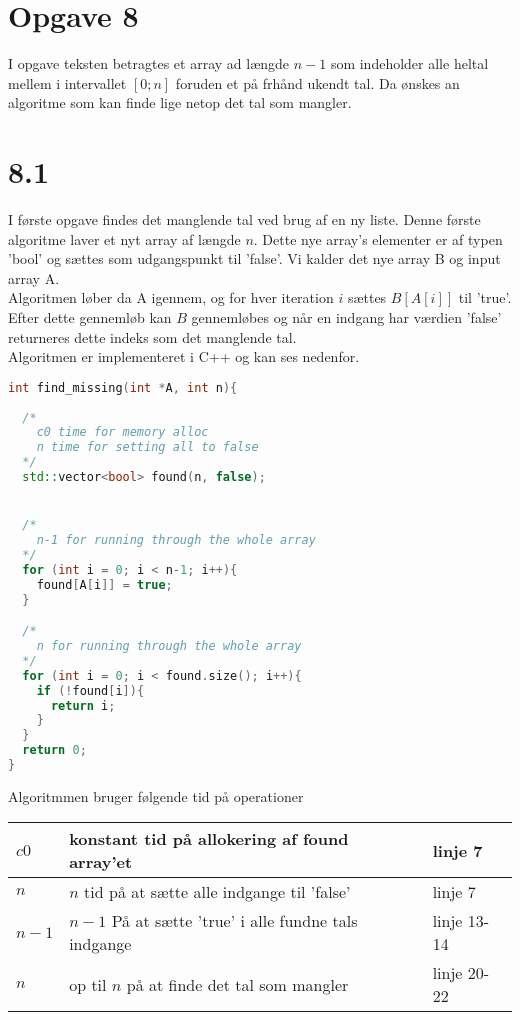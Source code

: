 \section*{Opgave 8}

I opgave teksten betragtes et array ad længde $n-1$ 
som indeholder alle heltal mellem i intervallet $\left[0;n\right]$ 
foruden et på frhånd ukendt tal. Da ønskes an algoritme som 
kan finde lige netop det tal som mangler.


\section*{8.1}

I første opgave findes det manglende tal ved brug af en ny liste.
Denne første algoritme laver et nyt array af længde $n$. Dette nye
array's elementer er af typen 'bool' og sættes som udgangspunkt til 'false'.
Vi kalder det nye array B og input array A.\\

Algoritmen løber da A igennem, og for hver iteration $i$ sættes 
$B \left[ A \left[ i \right] \right]$ til 'true'.\\

Efter dette gennemløb kan $B$ gennemløbes og når en indgang 
har værdien 'false' returneres dette indeks som det manglende tal.\\

Algoritmen er implementeret i C++ og kan ses nedenfor.


\begin{lstlisting}[language=C++]
int find_missing(int *A, int n){
  
  /*
    c0 time for memory alloc
    n time for setting all to false
  */
  std::vector<bool> found(n, false);


  /*
    n-1 for running through the whole array
  */
  for (int i = 0; i < n-1; i++){
    found[A[i]] = true;
  }

  /*
    n for running through the whole array
  */
  for (int i = 0; i < found.size(); i++){
    if (!found[i]){
      return i;
    }
  }
  return 0;
}
\end{lstlisting}


Algoritmmen bruger følgende tid på operationer

\begin{center}
\begin{tabular}{| l | l | l |}
\hline
$c0$ & konstant tid på allokering af found array'et & linje 7\\
\hline
$n$ & $n$ tid på at sætte alle indgange til 'false' & linje 7\\
\hline
$n-1$ & $n-1$ På at sætte 'true' i alle fundne tals indgange & linje 13-14\\
\hline
$n$ & op til $n$ på at finde det tal som mangler & linje 20-22\\
\hline
\end{tabular}
\end{center}



